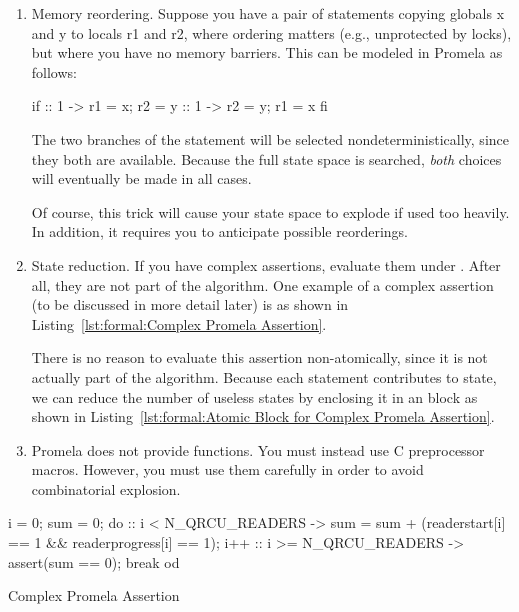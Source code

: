 \begin{enumerate}
\item	Memory reordering.
	Suppose you have a pair of statements copying globals x and y
	to locals r1 and r2, where ordering matters
        (e.g., unprotected by locks), but where you have no memory barriers.
	This can be modeled in Promela as follows:

\begin{VerbatimN}[samepage=true]
if
:: 1 -> r1 = x;
        r2 = y
:: 1 -> r2 = y;
        r1 = x
fi
\end{VerbatimN}

	The two branches of the  statement will be selected
	nondeterministically, since they both are available.
	Because the full state space is searched, \emph{both} choices
	will eventually be made in all cases.

	Of course, this trick will cause your state space to explode
	if used too heavily.
	In addition, it requires you to anticipate possible reorderings.

\item	State reduction.
	If you have complex assertions, evaluate them under .
	After all, they are not part of the algorithm.
	One example of a complex assertion (to be discussed in more
	detail later) is as shown in
	Listing~\ref{lst:formal:Complex Promela Assertion}.

	There is no reason to evaluate this assertion
	non-atomically, since it is not actually part of the algorithm.
	Because each statement contributes to state, we can reduce
	the number of useless states by enclosing it in an 
	block as shown in
	Listing~\ref{lst:formal:Atomic Block for Complex Promela Assertion}.

\item	Promela does not provide functions.
	You must instead use C preprocessor macros.
	However, you must use them carefully in order to avoid
	combinatorial explosion.
\end{enumerate}

\begin{listing}
\begin{VerbatimL}
i = 0;
sum = 0;
do
:: i < N_QRCU_READERS ->
	sum = sum + (readerstart[i] == 1 &&
	             readerprogress[i] == 1);
	i++
:: i >= N_QRCU_READERS ->
	assert(sum == 0);
	break
od
\end{VerbatimL}
\caption{Complex Promela Assertion}
\label{lst:formal:Complex Promela Assertion}
\end{listing}

